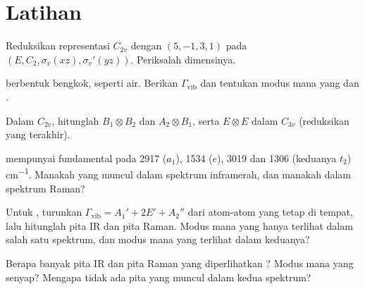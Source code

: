 \section{Latihan}

\begin{exercise}[$\star$]\label{exo:b3:group-theory-applied:1}
Reduksikan representasi $C_{2v}$ dengan  $(5, -1, 3, 1)$ pada $(E, C_2,
\sigma_v(xz), \sigma_v'(yz))$. Periksalah dimensinya.
\end{exercise}

\begin{exercise}[$\star$]\label{exo:b3:group-theory-applied:2}
 berbentuk bengkok, seperti air. Berikan $\Gamma_{\mathrm{vib}}$ dan
tentukan modus mana yang  dan .
\end{exercise}

\begin{exercise}[$\star$]\label{exo:b3:group-theory-applied:3}
Dalam $C_{2v}$, hitunglah  $B_1\otimes B_2$ dan
$A_2\otimes B_1$, serta $E\otimes E$ dalam $C_{3v}$ (reduksikan yang terakhir).
\end{exercise}

\begin{exercise}[$\star$]\label{exo:b3:group-theory-applied:4}
 mempunyai fundamental pada 2917 ($a_1$), 1534 ($e$), 3019 dan 1306
(keduanya $t_2$) \unit{cm^{-1}}. Manakah yang muncul dalam spektrum
inframerah, dan manakah dalam spektrum Raman?
\end{exercise}

\begin{exercise}[$\star\star$]\label{exo:b3:group-theory-applied:5}
Untuk , turunkan $\Gamma_{\mathrm{vib}} = A_1' + 2E' + A_2''$ dari atom-atom
yang tetap di tempat, lalu hitunglah pita IR dan pita Raman. Modus mana yang
hanya terlihat dalam salah satu spektrum, dan modus mana yang terlihat dalam
keduanya?
\end{exercise}

\begin{exercise}[$\star\star$]\label{exo:b3:group-theory-applied:6}
Berapa banyak pita IR dan pita Raman yang diperlihatkan ? Modus mana
yang senyap? Mengapa tidak ada pita yang muncul dalam kedua spektrum?
\end{exercise}

